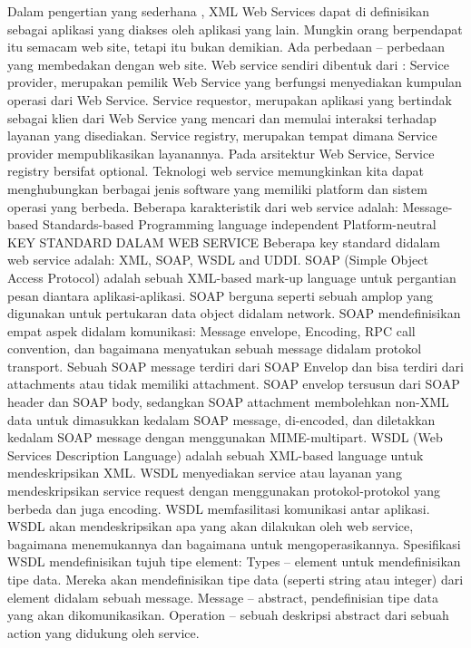 \documentclass[a4paper,11pt]{book}
\begin{document}
Dalam pengertian yang sederhana , XML Web Services dapat di definisikan sebagai aplikasi yang diakses oleh aplikasi yang lain. Mungkin orang berpendapat itu semacam web site, tetapi itu bukan demikian. Ada perbedaan – perbedaan yang membedakan dengan web site.
Web service sendiri dibentuk dari :
Service provider, merupakan pemilik Web Service yang berfungsi menyediakan kumpulan operasi dari Web Service.
Service requestor, merupakan aplikasi yang bertindak sebagai klien dari Web Service yang mencari dan memulai interaksi terhadap layanan yang disediakan.
Service registry, merupakan tempat dimana Service provider mempublikasikan layanannya. Pada arsitektur Web Service, Service registry bersifat optional. Teknologi web service memungkinkan kita dapat menghubungkan berbagai jenis software yang memiliki platform dan sistem operasi yang berbeda.
Beberapa karakteristik dari web service adalah:
Message-based
Standards-based
Programming language independent
Platform-neutral
KEY STANDARD DALAM WEB SERVICE
Beberapa key standard didalam web service adalah: XML, SOAP, WSDL and UDDI.
SOAP (Simple Object Access Protocol) adalah sebuah XML-based mark-up language untuk pergantian pesan diantara aplikasi-aplikasi. SOAP berguna seperti sebuah amplop yang digunakan untuk pertukaran data object didalam network. SOAP mendefinisikan empat aspek didalam komunikasi: Message envelope, Encoding, RPC call convention, dan bagaimana menyatukan sebuah message didalam protokol transport.
Sebuah SOAP message terdiri dari SOAP Envelop dan bisa terdiri dari attachments atau tidak memiliki attachment. SOAP envelop tersusun dari SOAP header dan SOAP body, sedangkan SOAP attachment membolehkan non-XML data untuk dimasukkan kedalam SOAP message, di-encoded, dan diletakkan kedalam SOAP message dengan menggunakan MIME-multipart.
WSDL (Web Services Description Language) adalah sebuah XML-based language untuk mendeskripsikan XML. WSDL menyediakan service atau layanan yang mendeskripsikan service request dengan menggunakan protokol-protokol yang berbeda dan juga encoding. WSDL memfasilitasi komunikasi antar aplikasi. WSDL akan mendeskripsikan apa yang akan dilakukan oleh web service, bagaimana menemukannya dan bagaimana untuk mengoperasikannya.
Spesifikasi WSDL mendefinisikan tujuh tipe element:
Types – element untuk mendefinisikan tipe data. Mereka akan mendefinisikan tipe data (seperti string atau integer) dari element didalam sebuah message.
Message – abstract, pendefinisian tipe data yang akan dikomunikasikan.
Operation – sebuah deskripsi abstract dari sebuah action yang didukung oleh service.
\end{document}
